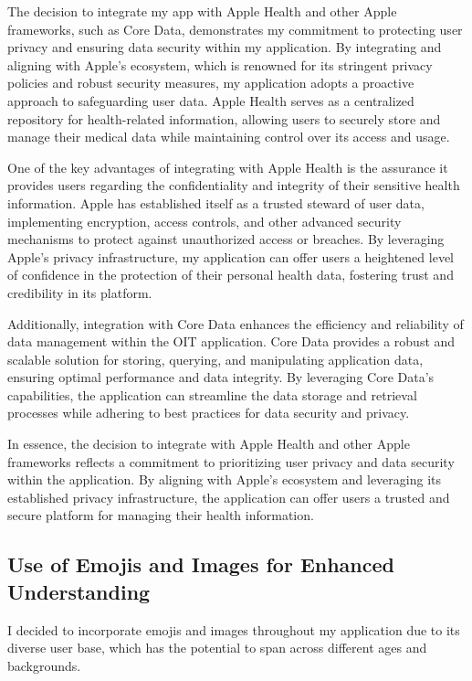The decision to integrate my app with Apple Health and other Apple frameworks, such as Core Data, demonstrates my commitment to protecting user privacy and ensuring data security within my application. By integrating and aligning with Apple's ecosystem, which is renowned for its stringent privacy policies and robust security measures, my application adopts a proactive approach to safeguarding user data. Apple Health serves as a centralized repository for health-related information, allowing users to securely store and manage their medical data while maintaining control over its access and usage.

One of the key advantages of integrating with Apple Health is the assurance it provides users regarding the confidentiality and integrity of their sensitive health information. Apple has established itself as a trusted steward of user data, implementing encryption, access controls, and other advanced security mechanisms to protect against unauthorized access or breaches. By leveraging Apple's privacy infrastructure, my application can offer users a heightened level of confidence in the protection of their personal health data, fostering trust and credibility in its platform.

Additionally, integration with Core Data enhances the efficiency and reliability of data management within the OIT application. Core Data provides a robust and scalable solution for storing, querying, and manipulating application data, ensuring optimal performance and data integrity. By leveraging Core Data's capabilities, the application can streamline the data storage and retrieval processes while adhering to best practices for data security and privacy.

In essence, the decision to integrate with Apple Health and other Apple frameworks reflects a commitment to prioritizing user privacy and data security within the application. By aligning with Apple's ecosystem and leveraging its established privacy infrastructure, the application can offer users a trusted and secure platform for managing their health information.

\subsection{Use of Emojis and Images for Enhanced Understanding}

I decided to incorporate emojis and images throughout my application due to its diverse user base, which has the potential to span across different ages and backgrounds. 

